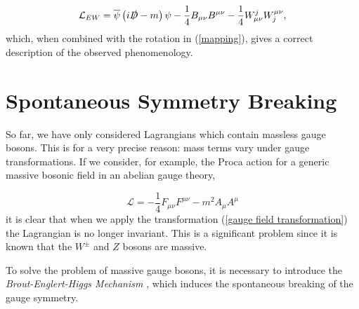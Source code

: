 \documentclass[10pt,a4paper]{book}
\begin{document}
\begin{equation}
\label{EW lagrangian}
\mathcal{L}_{EW} = \overline{\psi}\left(i\slashed{D} - m\right)\psi - \frac{1}{4}B_{\mu\nu}B^{\mu\nu} - \frac{1}{4}W^j_{\mu\nu}W_j^{\mu\nu},
\end{equation}
which, when combined with the rotation in (\ref{mapping}), gives a correct description of the observed phenomenology.
\section{Spontaneous Symmetry Breaking}
\label{Higgs section}

So far, we have only considered Lagrangians which contain massless gauge bosons. This is for a very precise reason: mass terms vary under gauge transformations. If we consider, for example, the Proca action for a generic massive bosonic field in an abelian gauge theory,

\begin{equation}
\mathcal{L} = -\frac{1}{4}F_{\mu\nu}F^{\mu\nu} - m^2 A_\mu A^\mu
\end{equation}
it is clear that when we apply the transformation (\ref{gauge field transformation}) the Lagrangian is no longer invariant. This is a significant problem since it is known that the $W^\pm$ and $Z$ bosons are massive.

To solve the problem of massive gauge bosons, it is necessary to introduce the \emph{Brout-Englert-Higgs Mechanism} \cite{PhysRevLett.13.508, PhysRevLett.19.1264}, which induces the spontaneous breaking of the gauge symmetry. 
\end{document}
